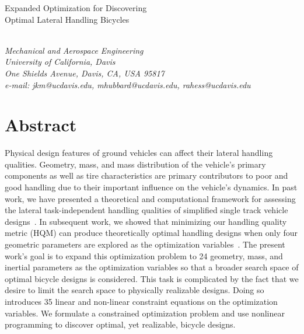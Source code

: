 \documentclass{bmd2019a}
\begin{document}
\begin{flushleft}
{\fontsize{16pt}{20pt}\selectfont%
  Expanded Optimization for Discovering\\}
{\fontsize{16pt}{20pt}\selectfont%
  Optimal Lateral Handling Bicycles}
\end{flushleft}

\begin{flushleft}
  {\\}
  \textit{Mechanical and Aerospace Engineering\\
          University of California, Davis\\
          One Shields Avenue, Davis, CA, USA 95817\\
          e-mail: jkm@ucdavis.edu, mhubbard@ucdavis.edu, rahess@ucdavis.edu}
\end{flushleft}

\section*{Abstract}
%
Physical design features of ground vehicles can affect their lateral handling
qualities. Geometry, mass, and mass distribution of the vehicle's primary
components as well as tire characteristics are primary contributors to poor and
good handling due to their important influence on the vehicle's dynamics. In
past work, we have presented a theoretical and computational framework for
assessing the lateral task-independent handling qualities of simplified single
track vehicle designs~\cite{Hess2012,Moore2012}. In subsequent work, we showed
that minimizing our handling quality metric (HQM) can produce theoretically
optimal handling designs when only four geometric parameters are explored as
the optimization variables~\cite{Moore2016}. The present work's goal is to
expand this optimization problem to 24 geometry, mass, and inertial parameters
as the optimization variables so that a broader search space of optimal bicycle
designs is considered. This task is complicated by the fact that we desire to
limit the search space to physically realizable designs. Doing so introduces 35
linear and non-linear constraint equations on the optimization variables. We
formulate a constrained optimization problem and use nonlinear programming to
discover optimal, yet realizable, bicycle designs.
\end{document}
